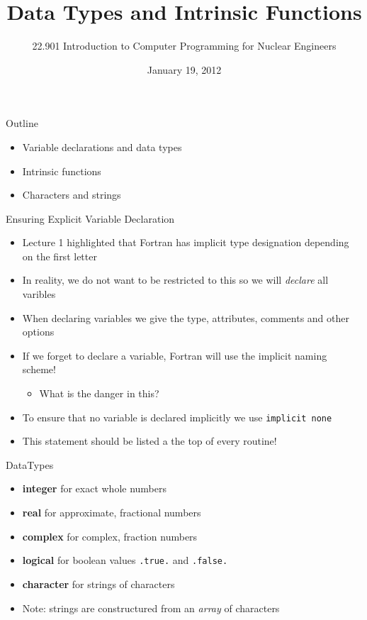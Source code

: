 \documentclass{beamer}
\title[Data Types and Intrinsic Functions]{Data Types and Intrinsic Functions}
\author[]{22.901 Introduction to Computer Programming for Nuclear Engineers}
\institute[\insertpagenumber]{}
\date{January 19, 2012}
\begin{document}

\frame{\titlepage}

\begin{frame}{Outline}
  \begin{itemize}
    \item Variable declarations and data types
    \vfill\item Intrinsic functions
    \vfill\item Characters and strings
  \end{itemize}
\end{frame}
\begin{frame}{Ensuring Explicit Variable Declaration}

  \begin{itemize}
    
    \item Lecture 1 highlighted that Fortran has implicit type designation depending on the first letter
    \vfill\item In reality, we do not want to be restricted to this so we will \emph{declare} all varibles
    \vfill\item When declaring variables we give the type, attributes, comments and other options
    \vfill\item If we forget to declare a variable, Fortran will use the implicit naming scheme!
      \begin{itemize}
	\item What is the danger in this?
      \end{itemize}
    \vfill\item To ensure that no variable is declared implicitly we use \texttt{implicit none}
    \vfill\item This statement should be listed a the top of every routine!

  \end{itemize}

\end{frame}
\begin{frame}{DataTypes}

  \begin{itemize}
    \item \textbf{integer} for exact whole numbers
    \vfill\item \textbf{real} for approximate, fractional numbers
    \vfill\item \textbf{complex} for complex, fraction numbers
    \vfill\item \textbf{logical} for boolean values \texttt{.true.} and \texttt{.false.}
    \vfill\item \textbf{character} for strings of characters
    \vfill\item \alert{Note:} strings are constructured from an \emph{array} of characters 
  \end{itemize}

\end{frame}
\end{document}
